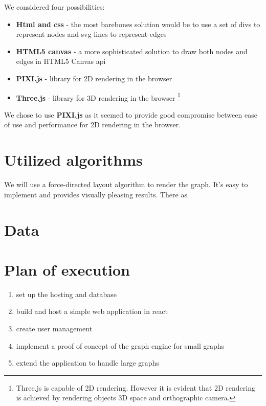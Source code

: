 We considered four possibilities:
\begin{itemize}
    \item \textbf{Html and css} - the most barebones solution would be to use a set of divs to represent nodes and svg lines to represent edges
    \item \textbf{HTML5 canvas} - a more sophisticated solution to draw both nodes and edges in HTML5 Canvas api
    \item \textbf{PIXI.js} - library for 2D rendering in the browser
    \item \textbf{Three.js} - library for 3D rendering in the browser
    \footnote{Three.js is capable of 2D rendering. However it is evident that 2D rendering is achieved by rendering objects 3D space and orthographic camera.} 
\end{itemize}

We chose to use \textbf{PIXI.js} as it seemed to provide good compromise between ease of use and performance for 2D rendering in the browser.

\section{Utilized algorithms}

We will use a force-directed layout algorithm to render the graph. It's easy to implement and provides visually pleasing results.
There as 

\section{Data}

\section{Plan of execution}
\begin{enumerate}
    \item set up the hosting and database
    \item build and host a simple web application in react
    \item create user management 
    \item implement a proof of concept of the graph engine for small graphs
    \item extend the application to handle large graphs
\end{enumerate}
